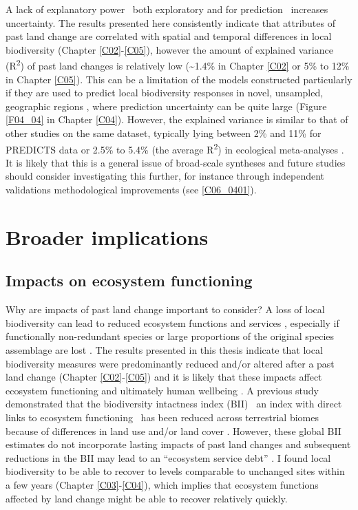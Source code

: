 A lack of explanatory power \textendash\ both exploratory and for prediction \textendash\ increases uncertainty. The results presented here consistently indicate that attributes of past land change are correlated with spatial and temporal differences in local biodiversity (Chapter \ref{C02}-\ref{C05}), however the amount of explained variance (R\textsuperscript{2}) of past land changes is relatively low (\textasciitilde 1.4\% in Chapter \ref{C02} or 5\% to 12\% in Chapter \ref{C05}). This can be a limitation of the models constructed particularly if they are used to predict local biodiversity responses in novel, \eg unsampled, geographic regions \citep{Jung2016}, where prediction uncertainty can be quite large (Figure \ref{F04_04} in Chapter \ref{C04}). However, the explained variance is similar to that of other studies on the same dataset, typically lying between 2\% and 11\% for PREDICTS data \citep{Newbold2014b,DePalma2015,Jung2016} or 2.5\% to 5.4\% (the average R\textsuperscript{2}) in ecological meta-analyses \citep{Moller2002}. It is likely that this is a general issue of broad-scale syntheses and future studies should consider investigating this further, for instance through independent validations methodological improvements (see \ref{C06_0401}).

\section{Broader implications}
\label{C06_03}
\subsection{Impacts on ecosystem functioning}
\label{C06_0301}

Why are impacts of past land change important to consider? A loss of local biodiversity can lead to reduced ecosystem functions and services \citep{Cardinale2012,Albrecht2014,Oliver2015b}, especially if functionally non-redundant species or large proportions of the original species assemblage are lost \citep{Oliver2015}. The results presented in this thesis indicate that local biodiversity measures were predominantly reduced and/or altered after a past land change (Chapter \ref{C02}-\ref{C05}) and it is likely that these impacts affect ecosystem functioning and ultimately human wellbeing \citep{Cardinale2012}. A previous study demonstrated that the biodiversity intactness index (BII) \textendash\ an index with direct links to ecosystem functioning \textendash\ has been reduced across terrestrial biomes because of differences in land use and/or land cover \citep{Newbold2016a}. However, these global BII estimates do not incorporate lasting impacts of past land changes and subsequent reductions in the BII may lead to an “ecosystem service debt” \citep{Isbell2015}. I found local biodiversity to be able to recover to levels comparable to unchanged sites within a few years (Chapter \ref{C03}-\ref{C04}), which implies that ecosystem functions affected by land change might be able to recover relatively quickly. 

